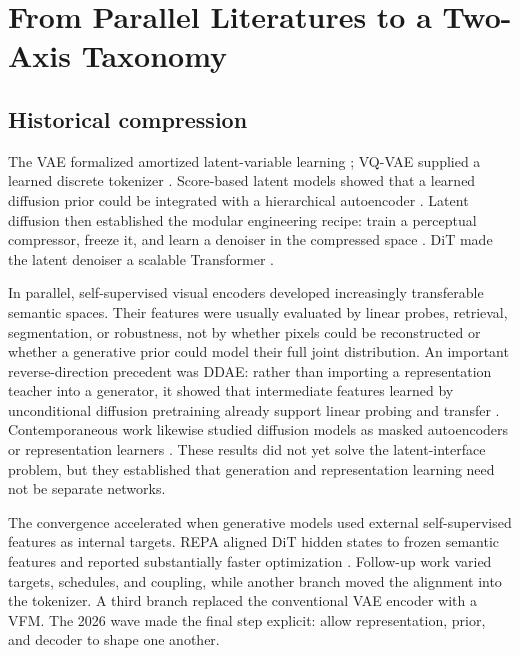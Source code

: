 \documentclass{article}
\newcommand{\method}[1]{\textsc{#1}}
\begin{document}
\section{From Parallel Literatures to a Two-Axis Taxonomy}
\label{sec:history}

\subsection{Historical compression}

The VAE formalized amortized latent-variable learning \citep{kingma2014vae}; VQ-VAE supplied a learned discrete tokenizer \citep{oord2017vqvae}. Score-based latent models showed that a learned diffusion prior could be integrated with a hierarchical autoencoder \citep{vahdat2021lsgm}. Latent diffusion then established the modular engineering recipe: train a perceptual compressor, freeze it, and learn a denoiser in the compressed space \citep{rombach2022ldm}. DiT made the latent denoiser a scalable Transformer \citep{peebles2023dit}.

In parallel, self-supervised visual encoders developed increasingly transferable semantic spaces. Their features were usually evaluated by linear probes, retrieval, segmentation, or robustness, not by whether pixels could be reconstructed or whether a generative prior could model their full joint distribution. An important reverse-direction precedent was \method{DDAE}: rather than importing a representation teacher into a generator, it showed that intermediate features learned by unconditional diffusion pretraining already support linear probing and transfer \citep{xiang2023ddae}. Contemporaneous work likewise studied diffusion models as masked autoencoders or representation learners \citep{wei2023dmae,yang2023drl}. These results did not yet solve the latent-interface problem, but they established that generation and representation learning need not be separate networks.

The convergence accelerated when generative models used external self-supervised features as internal targets. \method{REPA} aligned DiT hidden states to frozen semantic features and reported substantially faster optimization \citep{yu2024repa}. Follow-up work varied targets, schedules, and coupling, while another branch moved the alignment into the tokenizer. A third branch replaced the conventional VAE encoder with a VFM. The 2026 wave made the final step explicit: allow representation, prior, and decoder to shape one another.
\end{document}
